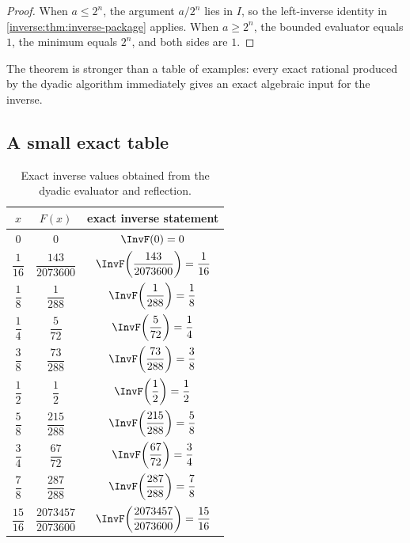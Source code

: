\documentclass[11pt,oneside]{article}
\theoremstyle{definition}
\theoremstyle{remark}
\begin{document}
\begin{proof}
When $a\leq2^n$, the argument $a/2^n$ lies in $I$, so the left-inverse
identity in \cref{inverse:thm:inverse-package} applies.  When $a\geq2^n$, the
bounded evaluator equals $1$, the minimum equals $2^n$, and both sides are
$1$.
\end{proof}

The theorem is stronger than a table of examples: every exact rational
produced by the dyadic algorithm immediately gives an exact algebraic
input for the inverse.

\subsection{A small exact table}

\begin{table}[ht]
\centering
\small
\begin{tabular}{@{}ccc@{}}
\toprule
$x$ & $F(x)$ & exact inverse statement\\
\midrule
$0$ & $0$ & $\InvF(0)=0$\\
$\dfrac1{16}$ & $\dfrac{143}{2073600}$
  & $\InvF\!\left(\dfrac{143}{2073600}\right)=\dfrac1{16}$\\[0.55em]
$\dfrac18$ & $\dfrac1{288}$
  & $\InvF\!\left(\dfrac1{288}\right)=\dfrac18$\\[0.55em]
$\dfrac14$ & $\dfrac5{72}$
  & $\InvF\!\left(\dfrac5{72}\right)=\dfrac14$\\[0.55em]
$\dfrac38$ & $\dfrac{73}{288}$
  & $\InvF\!\left(\dfrac{73}{288}\right)=\dfrac38$\\[0.55em]
$\dfrac12$ & $\dfrac12$
  & $\InvF\!\left(\dfrac12\right)=\dfrac12$\\[0.55em]
$\dfrac58$ & $\dfrac{215}{288}$
  & $\InvF\!\left(\dfrac{215}{288}\right)=\dfrac58$\\[0.55em]
$\dfrac34$ & $\dfrac{67}{72}$
  & $\InvF\!\left(\dfrac{67}{72}\right)=\dfrac34$\\[0.55em]
$\dfrac78$ & $\dfrac{287}{288}$
  & $\InvF\!\left(\dfrac{287}{288}\right)=\dfrac78$\\[0.55em]
$\dfrac{15}{16}$ & $\dfrac{2073457}{2073600}$
  & $\InvF\!\left(\dfrac{2073457}{2073600}\right)=\dfrac{15}{16}$\\
\bottomrule
\end{tabular}
\caption{Exact inverse values obtained from the dyadic evaluator and
reflection.}
\label{inverse:tab:inverse-dyadic}
\end{table}
\end{document}
